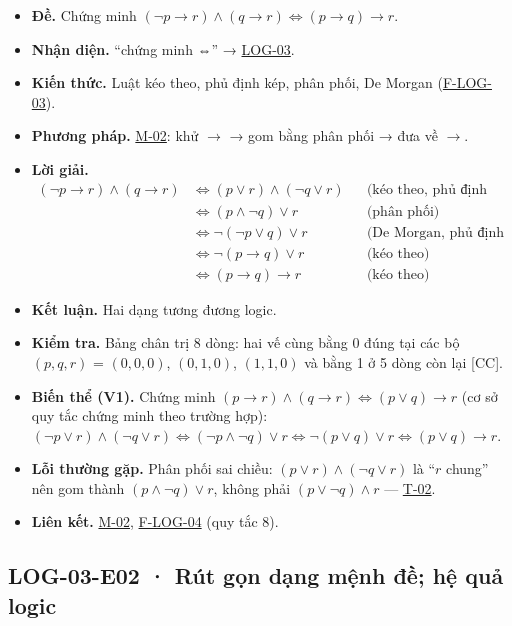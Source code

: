 \documentclass[
  10pt,
  twoside,openany]{book}
\begin{document}
\begin{itemize}
\item
  \textbf{Đề.} Chứng minh
  \((\neg p\to r)\wedge(q\to r)\Leftrightarrow(p\to q)\to r\).
\item
  \textbf{Nhận diện.} ``chứng minh ⇔'' →
  \protect\hyperlink{LOG-03}{LOG-03}.
\item
  \textbf{Kiến thức.} Luật kéo theo, phủ định kép, phân phối, De Morgan
  (\protect\hyperlink{F-LOG-03}{F-LOG-03}).
\item
  \textbf{Phương pháp.} \protect\hyperlink{M-02}{M-02}: khử \(\to\) →
  gom bằng phân phối → đưa về \(\to\).
\item
  \textbf{Lời giải.} \[
  \begin{aligned}
  (\neg p\to r)\wedge(q\to r)
  &\Leftrightarrow(p\vee r)\wedge(\neg q\vee r) &&\text{(kéo theo, phủ định kép)}\\
  &\Leftrightarrow(p\wedge\neg q)\vee r &&\text{(phân phối)}\\
  &\Leftrightarrow\neg(\neg p\vee q)\vee r &&\text{(De Morgan, phủ định kép)}\\
  &\Leftrightarrow\neg(p\to q)\vee r &&\text{(kéo theo)}\\
  &\Leftrightarrow(p\to q)\to r &&\text{(kéo theo)}
  \end{aligned}
  \]
\item
  \textbf{Kết luận.} Hai dạng tương đương logic.
\item
  \textbf{Kiểm tra.} Bảng chân trị 8 dòng: hai vế cùng bằng 0 đúng tại
  các bộ \((p,q,r)\) = \((0,0,0)\), \((0,1,0)\), \((1,1,0)\) và bằng 1 ở
  5 dòng còn lại {[}CC{]}.
\item
  \textbf{Biến thể (V1).} Chứng minh
  \((p\to r)\wedge(q\to r)\Leftrightarrow(p\vee q)\to r\) (cơ sở quy tắc
  chứng minh theo trường hợp):
  \((\neg p\vee r)\wedge(\neg q\vee r)\Leftrightarrow(\neg p\wedge\neg q)\vee r\Leftrightarrow\neg(p\vee q)\vee r\Leftrightarrow(p\vee q)\to r\).
\item
  \textbf{Lỗi thường gặp.} Phân phối sai chiều:
  \((p\vee r)\wedge(\neg q\vee r)\) là ``\(r\) chung'' nên gom thành
  \((p\wedge\neg q)\vee r\), không phải \((p\vee\neg q)\wedge r\) ---
  \protect\hyperlink{T-02}{T-02}.
\item
  \textbf{Liên kết.} \protect\hyperlink{M-02}{M-02},
  \protect\hyperlink{F-LOG-04}{F-LOG-04} (quy tắc 8).
\end{itemize}

\hypertarget{LOG-03-E02}{%
\subsection{LOG-03-E02 · Rút gọn dạng mệnh đề; hệ quả
logic}\label{LOG-03-E02}}
\end{document}
